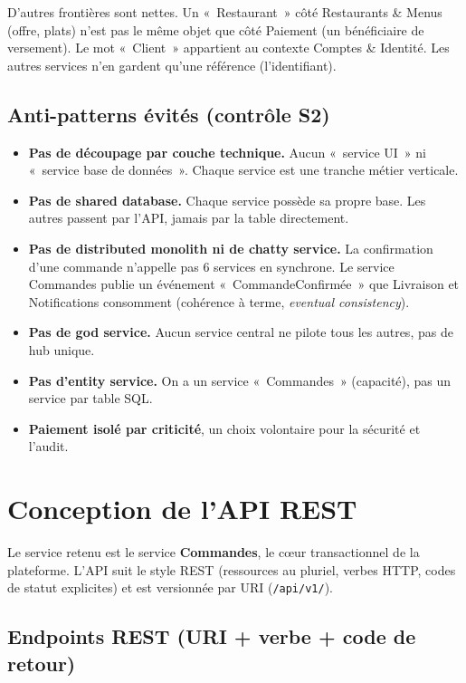 \documentclass[11pt,a4paper]{article}
\begin{document}
D'autres frontières sont nettes. Un «~Restaurant~» côté Restaurants \& Menus (offre, plats) n'est pas le même objet que côté Paiement (un bénéficiaire de versement). Le mot «~Client~» appartient au contexte Comptes \& Identité. Les autres services n'en gardent qu'une référence (l'identifiant).

\subsection{Anti-patterns évités (contrôle S2)}

\begin{itemize}
  \item \textbf{Pas de découpage par couche technique.} Aucun «~service UI~» ni «~service base de données~». Chaque service est une tranche métier verticale.
  \item \textbf{Pas de shared database.} Chaque service possède sa propre base. Les autres passent par l'API, jamais par la table directement.
  \item \textbf{Pas de distributed monolith ni de chatty service.} La confirmation d'une commande n'appelle pas 6 services en synchrone. Le service Commandes publie un événement «~CommandeConfirmée~» que Livraison et Notifications consomment (cohérence à terme, \emph{eventual consistency}).
  \item \textbf{Pas de god service.} Aucun service central ne pilote tous les autres, pas de hub unique.
  \item \textbf{Pas d'entity service.} On a un service «~Commandes~» (capacité), pas un service par table SQL.
  \item \textbf{Paiement isolé par criticité}, un choix volontaire pour la sécurité et l'audit.
\end{itemize}

\newpage
\section{Conception de l'API REST}

Le service retenu est le service \textbf{Commandes}, le cœur transactionnel de la plateforme. L'API suit le style REST (ressources au pluriel, verbes HTTP, codes de statut explicites) et est versionnée par URI (\texttt{/api/v1/}).

\subsection{Endpoints REST (URI + verbe + code de retour)}
\end{document}
